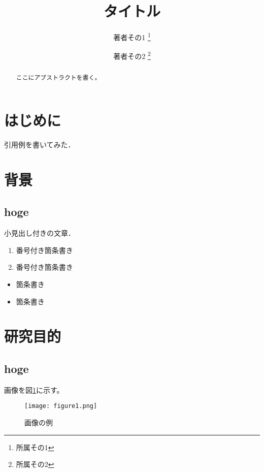 \documentclass[uplatex,a4j,10pt]{jsarticle}
\begin{document}

\title{タイトル}

\author{
    著者その1 \thanks{所属その1}
    \and
    著者その2 \thanks{所属その2}
}

\begin{abstract}
ここにアブストラクトを書く。
\end{abstract}

\maketitle
\thispagestyle{empty}

\section{はじめに}

引用例\cite{example}を書いてみた．

\section{背景}

\subsection{hoge}
小見出し付きの文章．

\begin{enumerate}
\item 番号付き箇条書き 
\item 番号付き箇条書き
\end{enumerate}

\begin{itemize}
\item 箇条書き
\item 箇条書き
\end{itemize}


\section{研究目的}

\subsection{hoge}
画像を図\ref{sample}に示す。

\begin{figure}[htbp]
    \begin{center}
        \texttt{[image: figure1.png]}
        \caption{画像の例}
        \label{sample}
    \end{center}
\end{figure}
 
\end{document}

